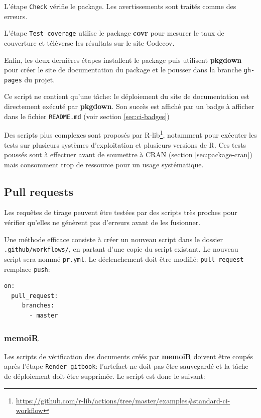 \documentclass[
  12pt,
  french,
  a4paper,
  extrafontsizes,onecolumn,openright
  ]{memoir}
\begin{document}
L'étape \texttt{Check} vérifie le package.
Les avertissements sont traités comme des erreurs.

L'étape \texttt{Test\ coverage} utilise le package \textbf{covr} pour mesurer le taux de couverture et téléverse les résultats sur le site Codecov.

Enfin, les deux dernières étapes installent le package puis utilisent \textbf{pkgdown} pour créer le site de documentation du package et le pousser dans la branche \texttt{gh-pages} du projet.

Ce script ne contient qu'une tâche: le déploiement du site de documentation est directement exécuté par \textbf{pkgdown}.
Son succès est affiché par un badge à afficher dans le fichier \texttt{README.md} (voir section \ref{sec:ci-badges})

Des scripts plus complexes sont proposés par R-lib\footnote{\url{https://github.com/r-lib/actions/tree/master/examples\#standard-ci-workflow}}, notamment pour exécuter les tests sur plusieurs systèmes d'exploitation et plusieurs versions de R.
Ces tests poussés sont à effectuer avant de soumettre à CRAN (section \ref{sec:package-cran}) mais consomment trop de ressource pour un usage systématique.

\subsection{Pull requests}\label{sec:ci-pr}

Les requêtes de tirage peuvent être testées par des scripts très proches pour vérifier qu'elles ne génèrent pas d'erreurs avant de les fusionner.

Une méthode efficace consiste à créer un nouveau script dans le dossier \texttt{.github/workflows/}, en partant d'une copie du script existant.
Le nouveau script sera nommé \texttt{pr.yml}.
Le déclenchement doit être modifié: \texttt{pull\_request} remplace \texttt{push}:

\begin{verbatim}
on:
  pull_request:
     branches:
       - master
\end{verbatim}

\subsubsection{memoiR}\label{sec:memoiR-pr-ci}

Les scripts de vérification des documents créés par \textbf{memoiR} doivent être coupés après l'étape \texttt{Render\ gitbook}: l'artefact ne doit pas être sauvegardé et la tâche de déploiement doit être supprimée.
Le script est donc le suivant:
\end{document}
